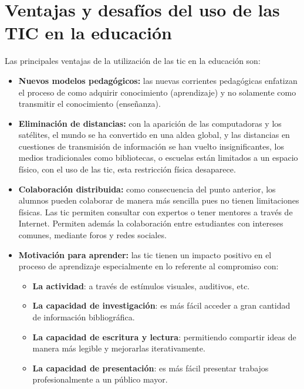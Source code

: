 \section[Ventajas y desafíos]{Ventajas y desafíos del uso de las TIC en la educación}
\label{sec:tics_ventajas}

Las principales ventajas de la utilización de las \Gls{tic} en la educación son:

\begin{itemize}

\item \textbf{Nuevos modelos pedagógicos:} las nuevas corrientes pedagógicas
    enfatizan el proceso de como adquirir conocimiento (aprendizaje) y no
    solamente como transmitir el conocimiento
    (enseñanza)\cite{guenaga2013serious}.

\item \textbf{Eliminación de distancias:} con la aparición de las computadoras y
    los satélites,  el mundo se ha convertido en una aldea global, y las
    distancias en cuestiones de transmisión de información se han vuelto
    insignificantes\cite{mohammed2013information},  los medios tradicionales
    como bibliotecas, o escuelas están limitados a un espacio  físico, con el
    uso de las \Gls{tic}, esta restricción física
    desaparece\cite{tinio:ict,punie:ict}.

\item \textbf{Colaboración distribuida:} como consecuencia del punto anterior,
    los alumnos pueden colaborar de manera más sencilla pues no tienen
    limitaciones físicas. Las \gls{tic} permiten consultar con expertos o tener
    mentores a través de Internet. Permiten además la colaboración entre
    estudiantes con intereses comunes, mediante foros y redes
    sociales\cite{unesco:ict}.

\item \textbf{Motivación para aprender:} las \Gls{tic} tienen un impacto
    positivo en el proceso de aprendizaje especialmente en lo referente al
    compromiso
    con\cite{passey2004motivational,egenfeldt2007third,martin2008modelo}:
	    
    \begin{itemize}
    \item \textbf{La actividad}: a través de estímulos visuales, auditivos, etc.
    \item \textbf{La capacidad de investigación}: es más fácil acceder a gran cantidad de
        información bibliográfica.
    \item \textbf{La capacidad de escritura y lectura}: permitiendo compartir  ideas de
        manera más legible y mejorarlas iterativamente.
    \item \textbf{La capacidad de presentación}: es más fácil presentar trabajos
        profesionalmente a un público mayor.
    \end{itemize}
	    

\end{itemize}

